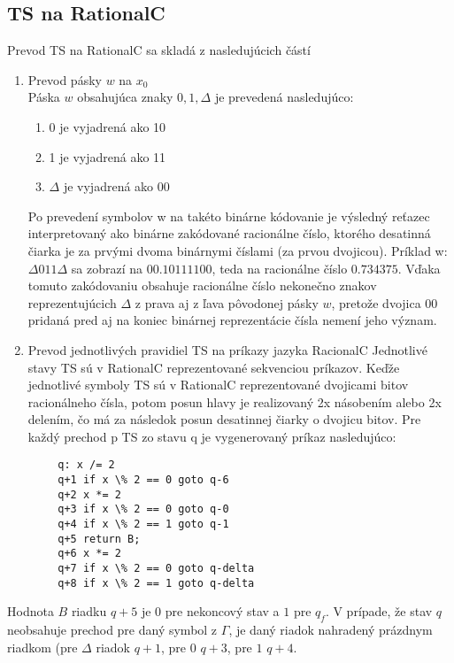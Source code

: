 \documentclass[10pt]{article}
\begin{document}
\subsection*{TS na RationalC}
Prevod TS na RationalC sa skladá z nasledujúcich částí
\begin{enumerate}
    \item Prevod pásky $w$ na $x_0$\\
        Páska $w$ obsahujúca znaky $0,1,\Delta$ je prevedená nasledujúco:
        \begin{enumerate}
            \item 0 je vyjadrená ako 10
            \item 1 je vyjadrená ako 11
            \item $\Delta$ je vyjadrená ako 00
        \end{enumerate}
        Po prevedení symbolov w na takéto binárne kódovanie je výsledný reťazec interpretovaný ako
        binárne zakódované racionálne číslo, ktorého desatinná čiarka je za prvými dvoma binárnymi
        číslami (za prvou dvojicou).
        Príklad w: $\Delta011\Delta$ sa zobrazí na $00. 10 11 11 00$, teda na racionálne číslo
        $0.734375$. Vďaka tomuto zakódovaniu obsahuje racionálne číslo nekonečno znakov
        reprezentujúcich $\Delta$ z prava aj z ľava pôvodonej pásky $w$, pretože dvojica 00 pridaná
        pred aj na koniec binárnej reprezentácie čísla nemení jeho význam.
    \item Prevod jednotlivých pravidiel TS na príkazy jazyka RacionalC
        Jednotlivé stavy TS sú v RationalC reprezentované sekvenciou príkazov. 
        Keďže jednotlivé symboly TS sú v RationalC reprezentované dvojicami bitov racionálneho čísla, potom posun hlavy je
        realizovaný 2x násobením alebo 2x delením, čo má za následok posun desatinnej čiarky o
        dvojicu bitov.
        Pre každý prechod p TS zo stavu q je vygenerovaný príkaz nasledujúco:
\end{enumerate}
        \begin{verbatim}
        q: x /= 2   
        q+1 if x \% 2 == 0 goto q-6 
        q+2 x *= 2
        q+3 if x \% 2 == 0 goto q-0 
        q+4 if x \% 2 == 1 goto q-1 
        q+5 return B;
        q+6 x *= 2
        q+7 if x \% 2 == 0 goto q-delta
        q+8 if x \% 2 == 1 goto q-delta
        \end{verbatim}
        Hodnota $B$ riadku $q+5$ je 0 pre nekoncový stav a $1$ pre $q_f$.
        V prípade, že stav $q$ neobsahuje prechod pre daný symbol z $\Gamma$, je daný riadok
        nahradený prázdnym riadkom (pre $\Delta$ riadok $q+1$, pre $0$ $q+3$, pre $1$ $q+4$.
\end{document}
